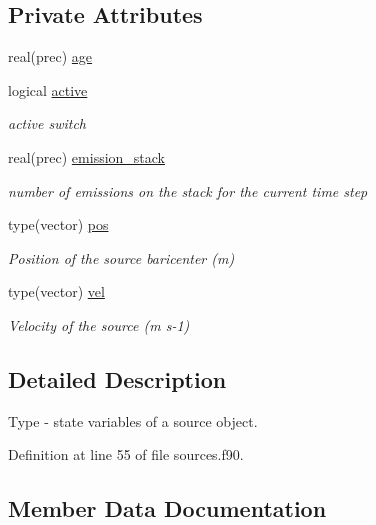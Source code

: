 \subsection*{Private Attributes}
\begin{DoxyCompactItemize}
\item 
real(prec) \mbox{\hyperlink{structsources__mod_1_1source__state_a60a0c06c969401978a8cd13b4682fe1c}{age}}
\item 
logical \mbox{\hyperlink{structsources__mod_1_1source__state_ab31d51c870b76a1e4ca9b03f5847a7c2}{active}}
\begin{DoxyCompactList}\small\item\em active switch \end{DoxyCompactList}\item 
real(prec) \mbox{\hyperlink{structsources__mod_1_1source__state_a8c705a419fbe999e624ac42ae586700a}{emission\+\_\+stack}}
\begin{DoxyCompactList}\small\item\em number of emissions on the stack for the current time step \end{DoxyCompactList}\item 
type(vector) \mbox{\hyperlink{structsources__mod_1_1source__state_a8dacf7040158bb5214f66476bf1a1c3d}{pos}}
\begin{DoxyCompactList}\small\item\em Position of the source baricenter (m) \end{DoxyCompactList}\item 
type(vector) \mbox{\hyperlink{structsources__mod_1_1source__state_a52c6f025eb262a7a07b2a8b4ec7065ac}{vel}}
\begin{DoxyCompactList}\small\item\em Velocity of the source (m s-\/1) \end{DoxyCompactList}\end{DoxyCompactItemize}


\subsection{Detailed Description}
Type -\/ state variables of a source object. 

Definition at line 55 of file sources.\+f90.



\subsection{Member Data Documentation}
\mbox{\label{structsources__mod_1_1source__state_ab31d51c870b76a1e4ca9b03f5847a7c2}} 
